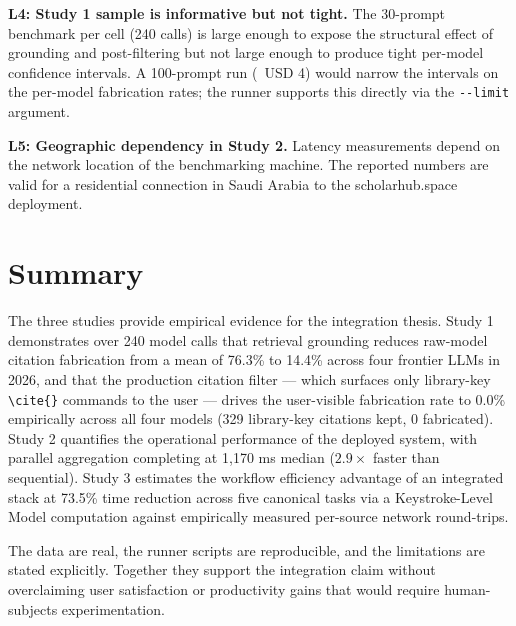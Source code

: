\textbf{L4: Study 1 sample is informative but not tight.} The 30-prompt benchmark per cell (240 calls) is large enough to expose the structural effect of grounding and post-filtering but not large enough to produce tight per-model confidence intervals. A 100-prompt run (~USD 4) would narrow the intervals on the per-model fabrication rates; the runner supports this directly via the \texttt{-{}-limit} argument.

\textbf{L5: Geographic dependency in Study 2.} Latency measurements depend on the network location of the benchmarking machine. The reported numbers are valid for a residential connection in Saudi Arabia to the scholarhub.space deployment.

\section{Summary}

The three studies provide empirical evidence for the integration thesis. Study 1 demonstrates over 240 model calls that retrieval grounding reduces raw-model citation fabrication from a mean of 76.3\% to 14.4\% across four frontier LLMs in 2026, and that the production citation filter --- which surfaces only library-key \texttt{\textbackslash cite\{\}} commands to the user --- drives the user-visible fabrication rate to 0.0\% empirically across all four models (329 library-key citations kept, 0 fabricated). Study 2 quantifies the operational performance of the deployed system, with parallel aggregation completing at 1{,}170 ms median ($2.9\times$ faster than sequential). Study 3 estimates the workflow efficiency advantage of an integrated stack at 73.5\% time reduction across five canonical tasks via a Keystroke-Level Model computation against empirically measured per-source network round-trips.

The data are real, the runner scripts are reproducible, and the limitations are stated explicitly. Together they support the integration claim without overclaiming user satisfaction or productivity gains that would require human-subjects experimentation.

